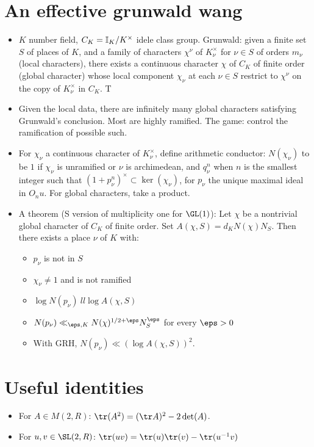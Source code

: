\documentclass[11pt]{amsart}
\begin{document}
\section{An effective grunwald wang}
\begin{itemize}
	\item $K$ number field, $C_K=\mathbb{I}_K/K^\times$ idele class group. Grunwald: given a finite set $S$ of places of $K$, and a family of characters $\chi^\nu$ of $K^\times_\nu$ for $\nu \in S$ of orders $m_\nu$ (local characters), there exists a continuous character $\chi$ of $C_K$ of finite order (global character) whose local component $\chi_\nu$ at each $\nu \in S$ restrict to $\chi^\nu$ on the copy of $K^\times_\nu $ in $C_K$.  T
	\item Given the local data, there are infinitely many global characters satisfying Grunwald's conclusion. Most are highly ramified. The game: control the ramification of possible such. 
	\item For $\chi_\nu$ a continuous character of $K_\nu^\times$, define arithmetic conductor: $N(\chi_\nu)$ to be $1$ if $\chi_\nu$ is unramified or $\nu$ is archimedean, and $q_\nu^n$ when $n$ is the smallest integer such that $(1+p_\nu^n)^\times \subset \ker(\chi_\nu)$, for $p_\nu$ the unique maximal ideal in $O_nu$. For global characters, take a product. 
	\item A theorem (S version of multiplicity one for $\GL(1)$): Let $\chi$ be a nontrivial global character of $C_K$ of finite order. Set $A(\chi,S)=d_K N(\chi)N_S$. Then there exists a place $\nu$ of $K$ with:
		\begin{itemize}
			\item $p_\nu$ is not in $S$
			\item $\chi_\nu \neq 1$ and is not ramified
			\item $\log N(p_\nu)  \	ll \log A(\chi,S)$ 
			\item $N(p_\nu) \ll_{\eps,K} N(\chi)^{1/2+\eps} N_S^\eps$ for every $\eps>0$
			\item With GRH, $N(p_\nu) \ll (\log A(\chi,S))^2$. 
		\end{itemize}		 
\end{itemize}

\section{Useful identities}
\begin{itemize}
	\item For $A\in M(2,R)$: $\tr (A^2)=(\tr A)^2-2\det(A)$.
	\item For $u,v\in \SL(2,R)$: $\tr(uv)=\tr(u)\tr(v)-\tr(u^{-1}v)$
\end{itemize}
\end{document}
